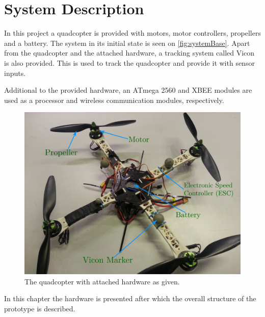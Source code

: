 \chapter{System Description}\label{cha:Systemdescription}
In this project a quadcopter is provided with motors, motor controllers, propellers and a battery. The system in its initial state is seen on \autoref{fig:systemBase}. Apart from the quadcopter and the attached hardware, a tracking system called Vicon is also provided. This is used to track the quadcopter and provide it with sensor inputs.

Additional to the provided hardware, an ATmega 2560 and XBEE modules are used as a processor and wireless communication modules, respectively.

\begin{figure}[H]
  \centering
  \includegraphics[width=.6\linewidth]{figures/quadcopterBaseLabels}
  \caption{The quadcopter with attached hardware as given.}
  \label{fig:systemBase}
\end{figure}

In this chapter the hardware is presented after which the overall structure of the prototype is described.